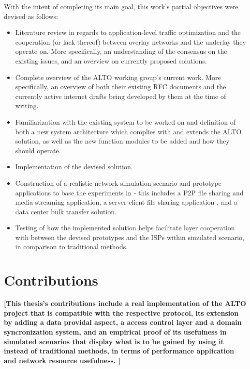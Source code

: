     With the intent of completing its main goal, this work's partial objectives were devised as follows:

\begin{itemize}
    \item Literature review in regards to application-level traffic optimization and the cooperation (or lack thereof) between overlay networks and the underlay they operate on.
        More specifically, an understanding of the consensus on the existing issues, and an overview on currently proposed solutions.
    \item Complete overview of the ALTO working group's current work.
        More specifically, an overview of both their existing RFC documents and the currently active internet drafts being developed by them at the time of writing.
    \item Familiarization with the existing system to be worked on and definition of both a new system architecture which complies with and extends the ALTO solution, as well as the new function modules to be added and how they should operate.
    \item Implementation of the devised solution.
    \item Construction of a realistic network simulation scenario and prototype applications to base the experiments in - this includes a P2P file sharing and media streaming application, a server-client file sharing application , and a data center bulk transfer solution.
    \item Testing of how the implemented solution helps facilitate layer cooperation with between the devised prototypes and the ISPs within simulated scenario, in comparison to traditional methods.
\end{itemize}

\section{Contributions}

\textbf{[This thesis's contributions include a real implementation of the ALTO project that is compatible with the respective protocol, its extension by adding a data providal aspect, a access control layer and a domain syncronization system, and an empirical proof of its usefulness in simulated scenarios that display what is to be gained by using it instead of traditional methods, in terms of performance application and network resource usefulness. ]}


